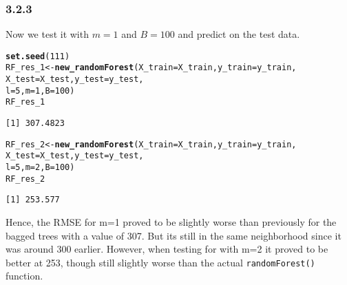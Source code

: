 \documentclass[10pt, a4paper, english]{article}\usepackage[]{graphicx}\usepackage[dvipsnames]{xcolor}
\makeatletter
\newcommand{\hlnum}[1]{\textcolor[rgb]{0.686,0.059,0.569}{#1}}%
\newcommand{\hlstd}[1]{\textcolor[rgb]{0.345,0.345,0.345}{#1}}%
\newcommand{\hlkwb}[1]{\textcolor[rgb]{0.69,0.353,0.396}{#1}}%
\newcommand{\hlkwc}[1]{\textcolor[rgb]{0.333,0.667,0.333}{#1}}%
\newcommand{\hlkwd}[1]{\textcolor[rgb]{0.737,0.353,0.396}{\textbf{#1}}}%
\newenvironment{kframe}{%
 \def\at@end@of@kframe{}%
 \ifinner\ifhmode%
  \def\at@end@of@kframe{\end{minipage}}%
  \begin{minipage}{\columnwidth}%
 \fi\fi%
 \def\FrameCommand##1{\hskip\@totalleftmargin \hskip-\fboxsep
 \colorbox{shadecolor}{##1}\hskip-\fboxsep
     \hskip-\linewidth \hskip-\@totalleftmargin \hskip\columnwidth}%
 \MakeFramed {\advance\hsize-\width
   \@totalleftmargin\z@ \linewidth\hsize
   \@setminipage}}%
 {\par\unskip\endMakeFramed%
 \at@end@of@kframe}
\newenvironment{knitrout}{}{} %
\makeatother
\begin{document}
\subsubsection{3.2.3}
Now we test it with $m=1$ and $B=100$ and predict on the test data. 
\begin{knitrout}
\color{fgcolor}\begin{kframe}
\begin{alltt}
\hlkwd{set.seed}\hlstd{(}\hlnum{111}\hlstd{)}
\hlstd{RF_res_1} \hlkwb{<-} \hlkwd{new_randomForest}\hlstd{(}\hlkwc{X_train}\hlstd{=X_train,} \hlkwc{y_train}\hlstd{=y_train,}
                    \hlkwc{X_test}\hlstd{=X_test,} \hlkwc{y_test} \hlstd{= y_test,}
                    \hlkwc{l}\hlstd{=}\hlnum{5}\hlstd{,} \hlkwc{m} \hlstd{=}\hlnum{1}\hlstd{,} \hlkwc{B} \hlstd{=} \hlnum{100}\hlstd{)}
\hlstd{RF_res_1}
\end{alltt}
\begin{verbatim}
[1] 307.4823
\end{verbatim}
\begin{alltt}
\hlstd{RF_res_2} \hlkwb{<-} \hlkwd{new_randomForest}\hlstd{(}\hlkwc{X_train}\hlstd{=X_train,} \hlkwc{y_train}\hlstd{=y_train,}
                    \hlkwc{X_test}\hlstd{=X_test,} \hlkwc{y_test} \hlstd{= y_test,}
                    \hlkwc{l}\hlstd{=}\hlnum{5}\hlstd{,} \hlkwc{m} \hlstd{=}\hlnum{2}\hlstd{,} \hlkwc{B} \hlstd{=} \hlnum{100}\hlstd{)}
\hlstd{RF_res_2}
\end{alltt}
\begin{verbatim}
[1] 253.577
\end{verbatim}
\end{kframe}
\end{knitrout}
Hence, the RMSE for m=1 proved to be slightly  worse than previously for the bagged trees with a value of 307. But its still in the same neighborhood since it was around 300 earlier.
However, when testing for with m=2 it proved to be better at 253, though still slightly worse than the actual \texttt{randomForest()} function.
\end{document}
